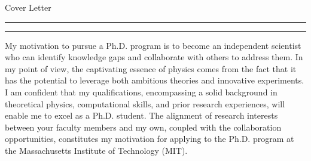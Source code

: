 \documentclass{article}
\newcommand{\soptitle}{Cover Letter}
\newcommand{\yourname}{Aryana Haghjoo}
\begin{document}
 \begin{center}\LARGE\soptitle\\
 \end{center}
 \vspace{5pt}
 \hrule
 \vspace{1pt}
 \hrule height 1pt
 
 \bigskip
My motivation to pursue a Ph.D. program is to become an independent scientist who can identify knowledge gaps and collaborate with others to address them. In my point of view, the captivating essence of physics comes from the fact that it has the potential to leverage both ambitious theories and innovative experiments.
I am confident that my qualifications, encompassing a solid background in theoretical physics, computational skills, and prior research experiences, will enable me to excel as a Ph.D. student. The alignment of research interests between your faculty members and my own, coupled with the collaboration opportunities, constitutes my motivation for applying to the Ph.D. program at the Massachusetts Institute of Technology (MIT).\par
\end{document}
